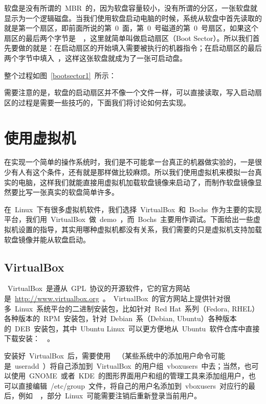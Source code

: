 软盘是没有所谓的~MBR~的，因为软盘容量较小，没有所谓的分区，一张软盘就显示为一个逻辑磁盘。当我们使用软盘启动电脑的时候，系统从软盘中首先读取的就是第一个扇区，即前面所说的第~0~面，第~0~号磁道的第~0~号扇区，如果这个扇区的最后两个字节是~~，这里就简单叫做启动扇区（Boot Sector）。所以我们首先要做的就是：在启动扇区的开始填入需要被执行的机器指令；在启动扇区的最后两个字节中填入~，这样这张软盘就成为了一张可启动盘。


整个过程如图~\ref{bootsector1}~所示：


需要注意的是，软盘的启动扇区并不像一个文件一样，可以直接读取，写入启动扇区的过程是需要一些技巧的，下面我们将讨论如何去实现。

\section{使用虚拟机}

在实现一个简单的操作系统时，我们是不可能拿一台真正的机器做实验的，一是很少有人有这个条件，还有就是那样做比较麻烦。所以我们使用虚拟机来模拟一台真实的电脑，这样我们就能直接用虚拟机加载软盘镜像来启动了，而制作软盘镜像显然要比写一张真实的软盘简单许多。

在~Linux~下有很多虚拟机软件，我们选择~VirtualBox~和~Bochs~作为主要的实现平台，我们用~VirtualBox~做~demo~，而~Bochs~主要用作调试。下面给出一些虚拟机设置的指导，其实用哪种虚拟机都没有关系，我们需要的只是虚拟机支持加载软盘镜像并能从软盘启动。

\subsection{VirtualBox}

~VirtualBox~是遵从~GPL~协议的开源软件，它的官方网站是~\url{http://www.virtualbox.org}~。~VirtualBox~的官方网站上提供针对很多~Linux~系统平台的二进制安装包，比如针对~Red Hat~系列（Fedora, RHEL）各种版本的~RPM~安装包，针对~Debian~系（Debian, Ubuntu）各种版本的~DEB~安装包，其中~Ubuntu
Linux~可以更方便地从~Ubuntu~软件仓库中直接下载安装：~~。

安装好~VirtualBox~后，需要使用~~（某些系统中的添加用户命令可能是~useradd~）将自己添加到~VirtualBox~的用户组~vboxusers~中去；当然，也可以使用~GNOME~或者~KDE~的图形界面用户和组的管理工具来添加组用户，也可以直接编辑~/etc/group~文件，将自己的用户名添加到~vboxusers~对应行的最后，例如~~，部分~Linux~可能需要注销后重新登录当前用户。

